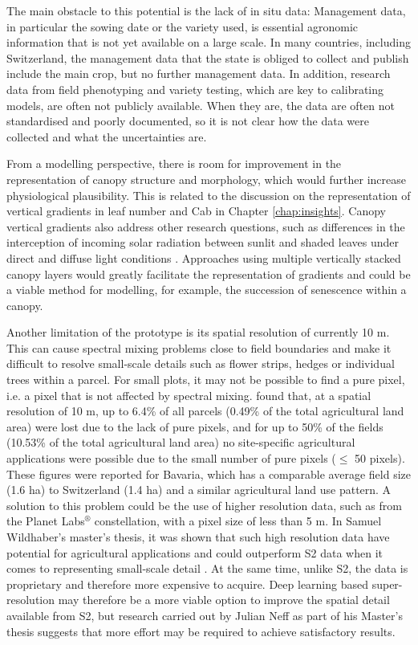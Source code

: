 The main obstacle to this potential is the lack of in situ data: Management data, in particular the sowing date or the variety used, is essential agronomic information that is not yet available on a large scale. In many countries, including Switzerland, the management data that the state is obliged to collect and publish include the main crop, but no further management data. In addition, research data from field phenotyping and variety testing, which are key to calibrating models, are often not publicly available. When they are, the data are often not standardised and poorly documented, so it is not clear how the data were collected and what the uncertainties are.

From a modelling perspective, there is room for improvement in the representation of canopy structure and morphology, which would further increase physiological plausibility. This is related to the discussion on the representation of vertical gradients in leaf number and \gls{Cab} in Chapter \ref{chap:insights}. Canopy vertical gradients also address other research questions, such as differences in the interception of incoming solar radiation between sunlit and shaded leaves under direct and diffuse light conditions \citep{he_development_2013}. Approaches using multiple vertically stacked canopy layers would greatly facilitate the representation of gradients and could be a viable method for modelling, for example, the succession of senescence within a canopy.

Another limitation of the prototype is its spatial resolution of currently 10 m. This can cause spectral mixing problems close to field boundaries and make it difficult to resolve small-scale details such as flower strips, hedges or individual trees within a parcel. For small plots, it may not be possible to find a pure pixel, i.e. a pixel that is not affected by spectral mixing. \cite{meier_assessments_2020} found that, at a spatial resolution of 10 m, up to 6.4\% of all parcels (0.49\% of the total agricultural land area) were lost due to the lack of pure pixels, and for up to 50\% of the fields (10.53\% of the total agricultural land area) no site-specific agricultural applications were possible due to the small number of pure pixels ($\le$ 50 pixels). These figures were reported for Bavaria, which has a comparable average field size (1.6 ha) to Switzerland (1.4 ha) and a similar agricultural land use pattern. A solution to this problem could be the use of higher resolution data, such as from the Planet Labs$^{\circledR}$ constellation, with a pixel size of less than 5 m. In Samuel Wildhaber's master's thesis, it was shown that such high resolution data have potential for agricultural applications and could outperform \gls{S2} data when it comes to representing small-scale detail \citep{wildhaber_assessing_2023}. At the same time, unlike \gls{S2}, the data is proprietary and therefore more expensive to acquire. Deep learning based super-resolution may therefore be a more viable option to improve the spatial detail available from \gls{S2}, but research carried out by Julian Neff as part of his Master's thesis suggests that more effort may be required to achieve satisfactory results.

